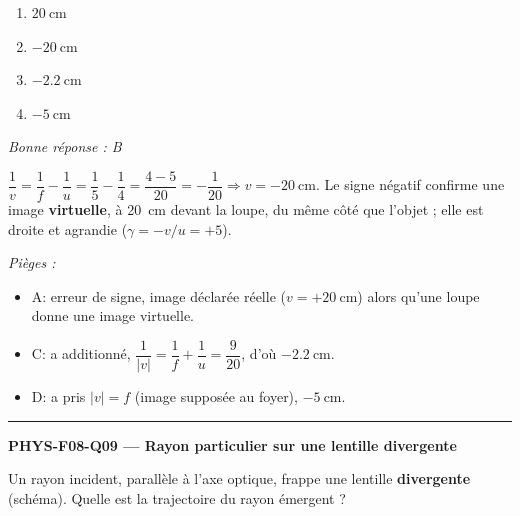 \documentclass[11pt,a4paper]{article}
\begin{document}
\begin{enumerate}[label=\Alph*)]
\item $\qty{20}{\centi\metre}$
\item $\qty{-20}{\centi\metre}$
\item $\qty{-2.2}{\centi\metre}$
\item $\qty{-5}{\centi\metre}$
\end{enumerate}
\textit{Bonne réponse : B}\par
$\dfrac1v=\dfrac1f-\dfrac1u=\dfrac15-\dfrac14=\dfrac{4-5}{20}=-\dfrac{1}{20}\Rightarrow v=\qty{-20}{\centi\metre}$.
Le signe négatif confirme une image \textbf{virtuelle}, à \qty{20}{\centi\metre} devant la loupe, du même côté
que l'objet ; elle est droite et agrandie ($\gamma=-v/u=+5$).\par
\textit{Pièges :}
\begin{itemize}
\item A: erreur de signe, image déclarée réelle ($v=+\qty{20}{\centi\metre}$) alors qu'une loupe donne une image virtuelle.
\item C: a additionné, $\dfrac{1}{|v|}=\dfrac1f+\dfrac1u=\dfrac{9}{20}$, d'où $\qty{-2.2}{\centi\metre}$.
\item D: a pris $|v|=f$ (image supposée au foyer), $\qty{-5}{\centi\metre}$.
\end{itemize}
\vspace{8pt}\hrule\vspace{8pt}

\noindent\textbf{PHYS-F08-Q09 --- Rayon particulier sur une lentille divergente}\par
Un rayon incident, parallèle à l'axe optique, frappe une lentille \textbf{divergente} (schéma). Quelle est la
trajectoire du rayon émergent ?

\begin{center}
\end{center}
\end{document}
